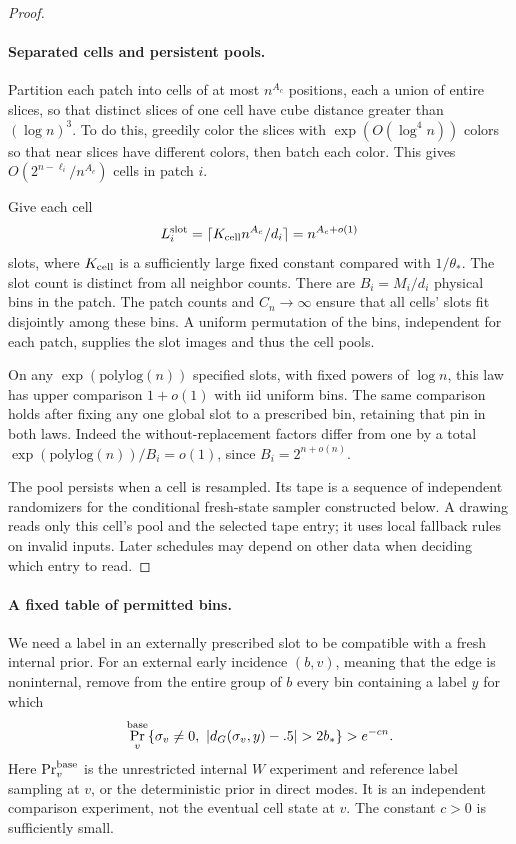 \begin{proof}
\paragraph{Separated cells and persistent pools.}
Partition each patch into cells of at most \(n^{A_c}\) positions, each a
union of entire slices, so that distinct slices of one cell have cube
distance greater than \((\log n)^3\). To do this, greedily color the
slices with \(\exp(O(\log^4 n))\) colors so that near slices have
different colors, then batch each color. This gives
\(O(2^{n-\ell_i}/n^{A_c})\) cells in patch \(i\).

Give each cell
\[
 L_i^{\rm slot}=\lceil K_{\rm cell}n^{A_c}/d_i\rceil
              =n^{A_c+o(1)}
\]
slots, where \(K_{\rm cell}\) is a sufficiently large fixed constant
compared with \(1/\theta_*\). The slot count is distinct from all
neighbor counts. There are \(B_i=M_i/d_i\) physical bins in the patch.
The patch counts and \(C_n\to\infty\) ensure that all cells' slots fit
disjointly among these bins. A uniform permutation of the bins, independent
for each patch, supplies the slot images and thus the cell pools.

On any \(\exp(\mathrm{polylog}(n))\) specified slots, with fixed powers
of \(\log n\), this law has upper comparison \(1+o(1)\) with iid
uniform bins. The same comparison holds after fixing any one global slot
to a prescribed bin, retaining that pin in both laws. Indeed the
without-replacement factors differ from one by a total
\(\exp(\mathrm{polylog}(n))/B_i=o(1)\), since \(B_i=2^{n+o(n)}\).

The pool persists when a cell is resampled. Its tape is a sequence of
independent randomizers for the conditional fresh-state sampler constructed
below. A drawing reads only this cell's pool and the selected tape entry;
it uses local fallback rules on invalid inputs. Later schedules may depend
on other data when deciding which entry to read.
\end{proof}

\paragraph{A fixed table of permitted bins.}
We need a label in an externally prescribed slot to be compatible with a
fresh internal prior. For an external early incidence \((b,v)\), meaning
that the edge is noninternal, remove from the entire group of \(b\) every
bin containing a label \(y\) for which
\begin{equation}
 \Pr_v^{\rm base}\{\sigma_v\ne0,\ |d_G(\sigma_v,y)-.5|>2b_*\}
       >e^{-c n}.                                                \label{eq:source-21}
\end{equation}
Here \(\Pr_v^{\rm base}\) is the unrestricted internal \(W\) experiment
and reference label sampling at \(v\), or the deterministic prior in
direct modes. It is an independent comparison experiment, not the eventual
cell state at \(v\). The constant \(c>0\) is sufficiently small.

